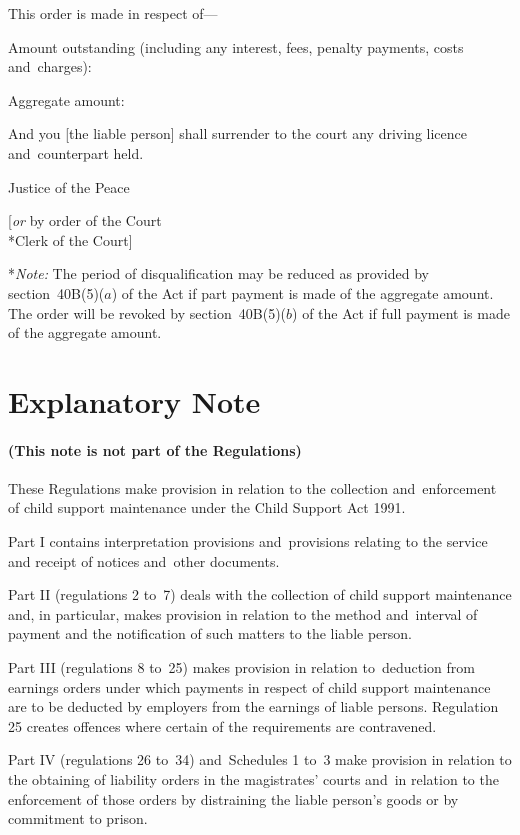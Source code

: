 \documentclass[12pt,a4paper]{article}
\begin{document}
This order is made in respect of---

Amount outstanding (including any interest, fees, penalty payments, costs and~charges):

\medskip

Aggregate amount:

\medskip

And you [the liable person] shall surrender to the court any driving licence and~counterpart held.

\medskip

{\raggedleft Justice of the Peace

\medskip

[\emph{or} by order of the Court\\*Clerk of the Court]

}

\medskip

*\emph{Note:} The period of disqualification may be reduced as provided by section~40B(5)($a$) of the Act if part payment is made of the aggregate amount.  The order will be revoked by section~40B(5)($b$) of the Act if full payment is made of the aggregate amount.

\part{Explanatory Note}

\renewcommand\parthead{--- Explanatory Note}

\subsection*{(This note is not part of the Regulations)}

 These Regulations make provision in relation to the collection and~enforcement of child support maintenance under the Child Support Act 1991.

  Part I contains interpretation provisions and~provisions relating to the service and receipt of notices and~other documents.

  Part II (regulations 2 to~7) deals with the collection of child support maintenance and, in particular, makes provision in relation to the method and~interval of payment and the notification of such matters to the liable person.

  Part III (regulations 8 to~25) makes provision in relation to~deduction from earnings orders under which payments in respect of child support maintenance are to be deducted by employers from the earnings of liable persons. Regulation 25 creates offences where certain of the requirements are contravened.

  Part IV (regulations 26 to~34) and~Schedules 1 to~3 make provision in relation to the obtaining of liability orders in the magistrates' courts and~in relation to the enforcement of those orders by distraining the liable person’s goods or by commitment to prison.
\end{document}
